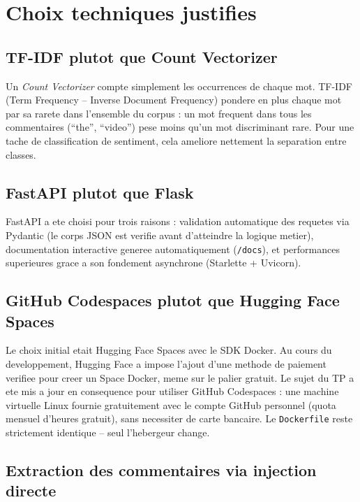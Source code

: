 \documentclass[11pt,a4paper]{article}
\begin{document}
\section{Choix techniques justifies}

\subsection{TF-IDF plutot que Count Vectorizer}

Un \emph{Count Vectorizer} compte simplement les occurrences de chaque mot. TF-IDF (Term Frequency -- Inverse Document Frequency) pondere en plus chaque mot par sa rarete dans l'ensemble du corpus : un mot frequent dans tous les commentaires (``the'', ``video'') pese moins qu'un mot discriminant rare. Pour une tache de classification de sentiment, cela ameliore nettement la separation entre classes.

\subsection{FastAPI plutot que Flask}

FastAPI a ete choisi pour trois raisons : validation automatique des requetes via Pydantic (le corps JSON est verifie avant d'atteindre la logique metier), documentation interactive generee automatiquement (\texttt{/docs}), et performances superieures grace a son fondement asynchrone (Starlette + Uvicorn).

\subsection{GitHub Codespaces plutot que Hugging Face Spaces}

Le choix initial etait Hugging Face Spaces avec le SDK Docker. Au cours du developpement, Hugging Face a impose l'ajout d'une methode de paiement verifiee pour creer un Space Docker, meme sur le palier gratuit. Le sujet du TP a ete mis a jour en consequence pour utiliser GitHub Codespaces : une machine virtuelle Linux fournie gratuitement avec le compte GitHub personnel (quota mensuel d'heures gratuit), sans necessiter de carte bancaire. Le \texttt{Dockerfile} reste strictement identique -- seul l'hebergeur change.

\subsection{Extraction des commentaires via injection directe}
\end{document}

